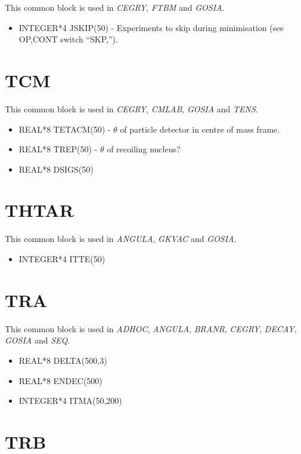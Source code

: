 This common block is used in {\em CEGRY}, {\em FTBM} and {\em GOSIA}.

\begin{itemize}
\item INTEGER*4 JSKIP(50) - Experiments to skip during minimisation (see
OP,CONT switch ``SKP,'').
\end{itemize}

\section{TCM}

This common block is used in {\em CEGRY}, {\em CMLAB}, {\em GOSIA} and {\em
TENS}.

\begin{itemize}
\item REAL*8 TETACM(50) - $\theta$ of particle detector in centre of mass
frame.
\item REAL*8 TREP(50) - $\theta$ of recoiling nucleus?
\item REAL*8 DSIGS(50)
\end{itemize}

\section{THTAR}

This common block is used in {\em ANGULA}, {\em GKVAC} and {\em GOSIA}.

\begin{itemize}
\item INTEGER*4 ITTE(50)
\end{itemize}

\section{TRA}

This common block is used in {\em ADHOC}, {\em ANGULA}, {\em BRANR}, {\em
CEGRY}, {\em DECAY}, {\em GOSIA} and {\em SEQ}.

\begin{itemize}
\item REAL*8 DELTA(500,3)
\item REAL*8 ENDEC(500)
\item INTEGER*4 ITMA(50,200)
\end{itemize}

\section{TRB}

